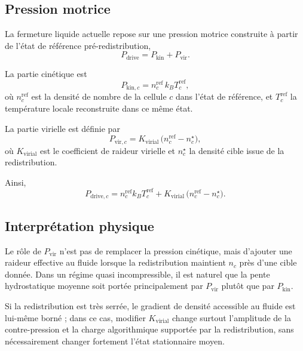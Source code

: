 \documentclass[11pt,a4paper]{article}
\begin{document}
\subsection{Pression motrice}

La fermeture liquide actuelle repose sur une pression motrice construite à partir de l'état de référence pré-redistribution,
\begin{equation}
 P_{\mathrm{drive}} = P_{\mathrm{kin}} + P_{\mathrm{vir}}.
\end{equation}

La partie cinétique est
\begin{equation}
 P_{\mathrm{kin},c} = n_c^{\mathrm{ref}}\,k_B T_c^{\mathrm{ref}},
\end{equation}
où $n_c^{\mathrm{ref}}$ est la densité de nombre de la cellule $c$ dans l'état de référence, et $T_c^{\mathrm{ref}}$ la température locale reconstruite dans ce même état.

La partie virielle est définie par
\begin{equation}
 P_{\mathrm{vir},c} = K_{\mathrm{virial}}\,\bigl(n_c^{\mathrm{ref}} - n_c^{\star}\bigr),
\end{equation}
où $K_{\mathrm{virial}}$ est le coefficient de raideur virielle et $n_c^{\star}$ la densité cible issue de la redistribution.

Ainsi,
\begin{equation}
 P_{\mathrm{drive},c} = n_c^{\mathrm{ref}} k_B T_c^{\mathrm{ref}} + K_{\mathrm{virial}}\,\bigl(n_c^{\mathrm{ref}} - n_c^{\star}\bigr).
\end{equation}

\subsection{Interprétation physique}

Le rôle de $P_{\mathrm{vir}}$ n'est pas de remplacer la pression cinétique, mais d'ajouter une raideur effective au fluide lorsque la redistribution maintient $n_c$ près d'une cible donnée. Dans un régime quasi incompressible, il est naturel que la pente hydrostatique moyenne soit portée principalement par $P_{\mathrm{vir}}$ plutôt que par $P_{\mathrm{kin}}$.

Si la redistribution est très serrée, le gradient de densité accessible au fluide est lui-même borné ; dans ce cas, modifier $K_{\mathrm{virial}}$ change surtout l'amplitude de la contre-pression et la charge algorithmique supportée par la redistribution, sans nécessairement changer fortement l'état stationnaire moyen.
\end{document}
